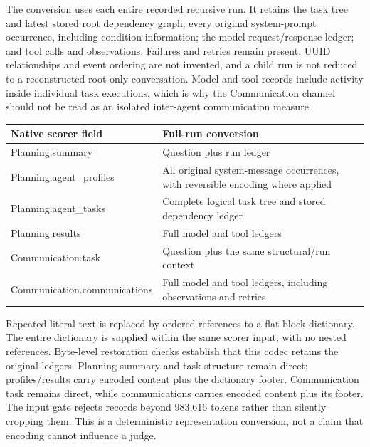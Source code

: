\documentclass[10pt,letterpaper,twocolumn]{article}
\begin{document}
The conversion uses each entire recorded recursive run. It retains the task tree and latest stored root dependency graph; every original system-prompt occurrence, including condition information; the model request/response ledger; and tool calls and observations. Failures and retries remain present. UUID relationships and event ordering are not invented, and a child run is not reduced to a reconstructed root-only conversation. Model and tool records include activity inside individual task executions, which is why the Communication channel should not be read as an isolated inter-agent communication measure.


\begin{center}\small\begin{tabularx}{\linewidth}{@{}>{\raggedright\arraybackslash}X>{\raggedright\arraybackslash}X@{}}\toprule

\textbf{Native scorer field} & \textbf{Full-run conversion}\\\midrule

Planning.summary & Question plus run ledger\\

Planning.agent\_profiles & All original system-message occurrences, with reversible encoding where applied\\

Planning.agent\_tasks & Complete logical task tree and stored dependency ledger\\

Planning.results & Full model and tool ledgers\\

Communication.task & Question plus the same structural/run context\\

Communication.communications & Full model and tool ledgers, including observations and retries\\

\bottomrule\end{tabularx}\end{center}

Repeated literal text is replaced by ordered references to a flat block dictionary. The entire dictionary is supplied within the same scorer input, with no nested references. Byte-level restoration checks establish that this codec retains the original ledgers. Planning summary and task structure remain direct; profiles/results carry encoded content plus the dictionary footer. Communication task remains direct, while communications carries encoded content plus its footer. The input gate rejects records beyond 983,616 tokens rather than silently cropping them. This is a deterministic representation conversion, not a claim that encoding cannot influence a judge.
\end{document}
